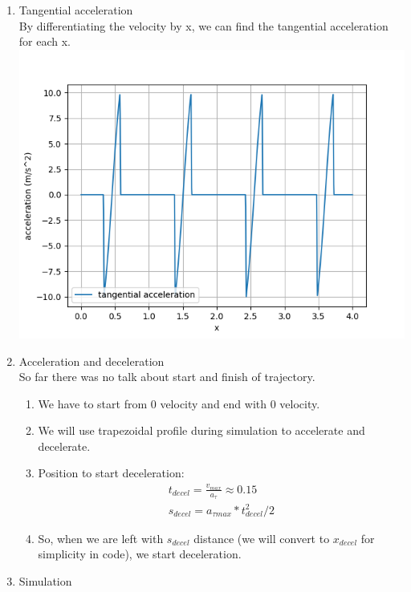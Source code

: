 \documentclass{article}
\begin{document}
\begin{enumerate}
\begin{enumerate}
            \end{enumerate}
      \item Tangential acceleration \\
            By differentiating the velocity by x, we can find the tangential acceleration for each x. \\
            \includegraphics[width=\linewidth]{acctan_x.png}
      \item Acceleration and deceleration \\
            So far there was no talk about start and finish of trajectory.
            \begin{enumerate}
                  \item We have to start from 0 velocity and end with 0 velocity.
                  \item We will use trapezoidal profile during simulation to accelerate and decelerate.
                  \item Position to start deceleration:
                        \begin{align}
                              t_{decel} = \frac{v_{max}}{a_{\tau}} \approx 0.15 \\
                              s_{decel} = a_{\tau max} * t_{decel}^2 / 2
                        \end{align}
                  \item So, when we are left with $s_{decel}$ distance (we will convert to $x_{decel}$ for simplicity in code),
                        we start deceleration.
            \end{enumerate}
      \item Simulation \\

\end{enumerate}
\end{document}
